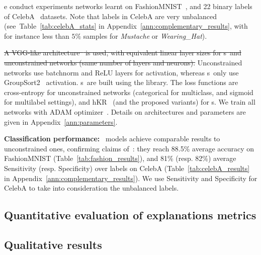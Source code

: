 e conduct experiments networks learnt on FashionMNIST~\cite{Xiao2017FashionMNIST}, and 22 binary labels of CelebA~\cite{liu2015faceattributes} datasets. Note that labels in CelebA are very unbalanced (see~Table~\ref{tab:celebA_stats} in Appendix~\ref{ann:complementary_results}, with for instance less than $5\%$ samples for \textit{Mustache} or \textit{Wearing\_Hat}).%

\sout{A VGG-like architecture~\cite{Parkhi15VGG} is used, with equivalent linear layer sizes for \otnn s~and unconstrained networks (same number of layers and neurons).} Unconstrained networks use batchnorm and ReLU layers for activation, whereas \otnn s~only use GroupSort2~\cite{pmlr-v97-anil19a,serrurier2021achieving} activation. \otnn s~are built using the \Deellip library.
The loss functions are cross-entropy for unconstrained networks (categorical for multiclass, and sigmoid for multilabel settings), and hKR \losshkr~(and the proposed variants) for \otnn s. We train all networks with ADAM optimizer~\cite{Diederik14Adam}. Details on architectures and parameters are given in Appendix~\ref{ann:parameters}.


\textbf{Classification performance:} \otnn~models achieve comparable results to  unconstrained ones, confirming claims of~\cite{bethunelip}: they reach 88.5\%
average accuracy on FashionMNIST
(Table~\ref{tab:fashion_results}), and 81\% (resp. 82\%) average Sensitivity (resp. Specificity) over labels on CelebA (Table~\ref{tab:celebA_results} in Appendix~\ref{ann:complementary_results}). We use  Sensitivity and Specificity for CelebA to take into consideration the unbalanced labels. 






\subsection{Quantitative evaluation of explanations metrics}


\subsection{Qualitative results}
